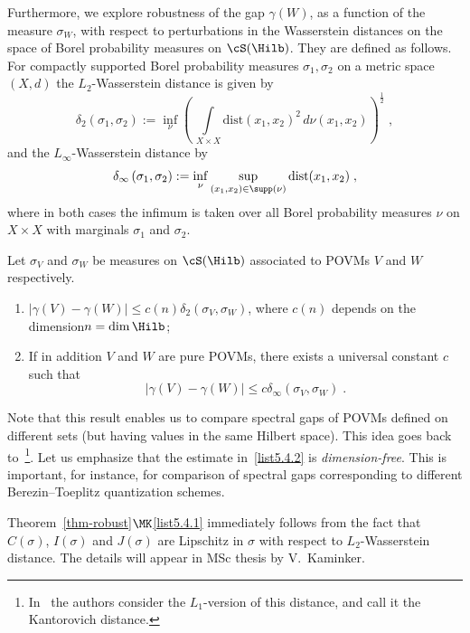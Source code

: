 Furthermore, we explore robustness of the gap $\gamma(W)$, as a function of the measure $\sigma_W$, with respect to perturbations in the Wasserstein distances on the space of Borel probability measures on $\cS(\Hilb)$. They are defined as follows. For compactly supported Borel probability measures $\sigma_1,\sigma_2 $ on a metric space $(X,d)$ the $L_2$-Wasserstein distance is given by
\[
\delta_2 \left(\sigma_1, \sigma_2 \right) := \inf \limits_{\nu} \left(\,\int \limits_{X\times X} \text{dist}\left(x_1, x_2\right)^2 \, d\nu(x_1,x_2)\right)^{\frac{1}{2}}\;,
\]
and the $L_\infty$-Wasserstein distance by
\[
\delta_\infty \left(\sigma_1, \sigma_2 \right) := \inf \limits_{\nu} \sup_{(x_1,x_2)\in \supp (\nu)} \text{dist}(x_1,x_2)\;,
\]
where in both cases the infimum is taken over all Borel probability measures $\nu$ on $X \times X $ with marginals $\sigma_1$ and $\sigma_2$.


\begin{theo}\label{thm-robust}
Let $\sigma_V$ and $\sigma_W$ be measures on $\cS(\Hilb)$ associated to POVMs $V$ and $W$ respectively.
\begin{enumerate}\romanenumi
\item \label{list5.4.1}$| \gamma(V) - \gamma(W)| \leq c(n) \delta_2(\sigma_V,\sigma_W)$, where $c(n)$ depends on the dimension\linebreak$n=\dim \Hilb$;
\item \label{list5.4.2}If in addition $V$ and $W$ are pure POVMs, there exists a universal constant $c$ such that
\begin{equation}\label{eq-rob-pure}
|\gamma(V) - \gamma(W)| \leq c\delta_\infty(\sigma_V,\sigma_W)\;.
\end{equation}
\end{enumerate}
\end{theo}

%
Note that this result enables us to compare spectral gaps of POVMs defined on different sets (but having values in the same Hilbert space). This idea goes back to~\cite{OC}\footnote{In~\cite{OC} the authors consider the $L_1$-version of this distance, and call it the Kantorovich distance.}. Let us emphasize that the estimate in~\eqref{list5.4.2} is \emph{dimension-free}. This is important, for instance, for comparison of spectral gaps corresponding to different Berezin--Toeplitz quantization schemes.

Theorem~\ref{thm-robust}$\MK$\eqref{list5.4.1} immediately follows from the fact that $C(\sigma)$, $I(\sigma)$ and $J(\sigma)$ are Lipschitz in $\sigma$ with respect to $L_2$-Wasserstein distance. The details will appear in MSc thesis by V.~Kaminker.

